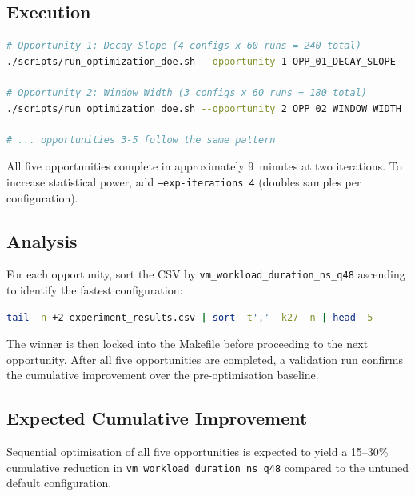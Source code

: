 \subsection{Execution}


\begin{lstlisting}[language=bash]
# Opportunity 1: Decay Slope (4 configs x 60 runs = 240 total)
./scripts/run_optimization_doe.sh --opportunity 1 OPP_01_DECAY_SLOPE

# Opportunity 2: Window Width (3 configs x 60 runs = 180 total)
./scripts/run_optimization_doe.sh --opportunity 2 OPP_02_WINDOW_WIDTH

# ... opportunities 3-5 follow the same pattern
\end{lstlisting}

All five opportunities complete in approximately 9~minutes at two iterations.
To increase statistical power, add \texttt{--exp-iterations 4} (doubles
samples per configuration).

\subsection{Analysis}

For each opportunity, sort the CSV by \texttt{vm\_workload\_duration\_ns\_q48}
ascending to identify the fastest configuration:

\begin{lstlisting}[language=bash]
tail -n +2 experiment_results.csv | sort -t',' -k27 -n | head -5
\end{lstlisting}

The winner is then locked into the Makefile before proceeding to the next
opportunity. After all five opportunities are completed, a validation run
confirms the cumulative improvement over the pre-optimisation baseline.

\subsection{Expected Cumulative Improvement}

Sequential optimisation of all five opportunities is expected to yield a
15--30\% cumulative reduction in \texttt{vm\_workload\_duration\_ns\_q48}
compared to the untuned default configuration.

